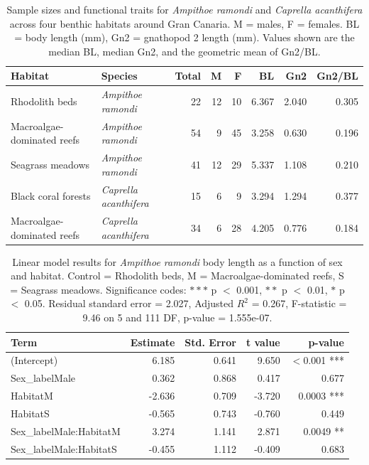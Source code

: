 \documentclass[journal,article,submit,pdftex,moreauthors]{Definitions/mdpi}
\begin{document}
\begin{table}[H] 
\caption{Sample sizes and functional traits for \textit{Ampithoe ramondi} and \textit{Caprella acanthifera} across four benthic habitats around Gran Canaria. M = males, F = females. BL = body length (mm), Gn2 = gnathopod 2 length (mm). Values shown are the median BL, median Gn2, and the geometric mean of Gn2/BL.\label{tab:supp_tableA1}}
\begin{tabularx}{\textwidth}{l l r r r r r r}
\toprule
Habitat & Species & Total & M & F & BL & Gn2 & Gn2/BL \\
\midrule
Rhodolith beds & \textit{Ampithoe ramondi} & 22 & 12 & 10 & 6.367 & 2.040 & 0.305 \\
Macroalgae-dominated reefs & \textit{Ampithoe ramondi} & 54 & 9 & 45 & 3.258 & 0.630 & 0.196 \\
Seagrass meadows & \textit{Ampithoe ramondi} & 41 & 12 & 29 & 5.337 & 1.108 & 0.210 \\
Black coral forests & \textit{Caprella acanthifera} & 15 & 6 & 9 & 3.294 & 1.294 & 0.377 \\
Macroalgae-dominated reefs & \textit{Caprella acanthifera} & 34 & 6 & 28 & 4.205 & 0.776 & 0.184 \\
\bottomrule
\end{tabularx}
\label{tab:table1}
\end{table}

\begin{table}[H]
\caption{Linear model results for \textit{Ampithoe ramondi} body length as a function of sex and habitat. Control = Rhodolith beds, M = Macroalgae-dominated reefs, S = Seagrass meadows. Significance codes: $***$ p $<$ 0.001, $**$ p $<$ 0.01, $*$ p $<$ 0.05. Residual standard error = 2.027, Adjusted $R^2$ = 0.267, F-statistic = 9.46 on 5 and 111 DF, p-value = 1.555e-07.\label{tab:supp_tableA2}}
\centering
\begin{tabularx}{\textwidth}{l r r r r}
\toprule
Term & Estimate & Std. Error & t value & p-value \\
\midrule
(Intercept) & 6.185 & 0.641 & 9.650 & $<$0.001 *** \\
Sex\_labelMale & 0.362 & 0.868 & 0.417 & 0.677 \\
HabitatM & -2.636 & 0.709 & -3.720 & 0.0003 *** \\
HabitatS & -0.565 & 0.743 & -0.760 & 0.449 \\
Sex\_labelMale:HabitatM & 3.274 & 1.141 & 2.871 & 0.0049 ** \\
Sex\_labelMale:HabitatS & -0.455 & 1.112 & -0.409 & 0.683 \\
\bottomrule
\end{tabularx}
\end{table}
\end{document}
